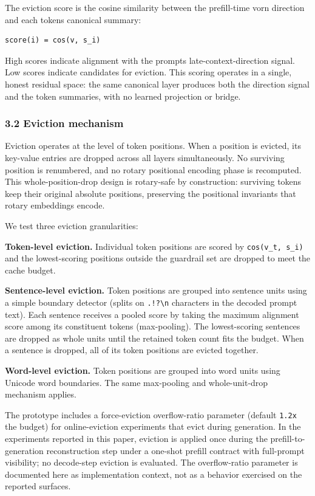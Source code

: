 \documentclass[
]{article}
\begin{document}
The eviction score is the cosine similarity between the prefill-time
vorn direction and each token\textquotesingle s canonical summary:

\begin{verbatim}
score(i) = cos(v, s_i)
\end{verbatim}

High scores indicate alignment with the prompt\textquotesingle s
late-context-direction signal. Low scores indicate candidates for
eviction. This scoring operates in a single, honest residual space: the
same canonical layer produces both the direction signal and the token
summaries, with no learned projection or bridge.

\subsubsection{3.2 Eviction mechanism}\label{32-eviction-mechanism}

Eviction operates at the level of token positions. When a position is
evicted, its key-value entries are dropped across all layers
simultaneously. No surviving position is renumbered, and no rotary
positional encoding phase is recomputed. This whole-position-drop design
is rotary-safe by construction: surviving tokens keep their original
absolute positions, preserving the positional invariants that rotary
embeddings encode.

We test three eviction granularities:

\textbf{Token-level eviction.} Individual token positions are scored by
\texttt{cos(v\_t,\ s\_i)} and the lowest-scoring positions outside the
guardrail set are dropped to meet the cache budget.

\textbf{Sentence-level eviction.} Token positions are grouped into
sentence units using a simple boundary detector (splits on
\texttt{.!?\textbackslash{}n} characters in the decoded prompt text).
Each sentence receives a pooled score by taking the maximum alignment
score among its constituent tokens (max-pooling). The lowest-scoring
sentences are dropped as whole units until the retained token count fits
the budget. When a sentence is dropped, all of its token positions are
evicted together.

\textbf{Word-level eviction.} Token positions are grouped into word
units using Unicode word boundaries. The same max-pooling and
whole-unit-drop mechanism applies.

The prototype includes a force-eviction overflow-ratio parameter
(default \texttt{1.2x} the budget) for online-eviction experiments that
evict during generation. In the experiments reported in this paper,
eviction is applied once during the prefill-to-generation reconstruction
step under a one-shot prefill contract with full-prompt visibility; no
decode-step eviction is evaluated. The overflow-ratio parameter is
documented here as implementation context, not as a behavior exercised
on the reported surfaces.
\end{document}
